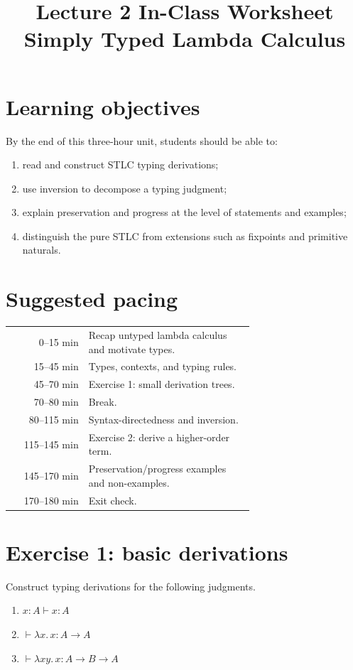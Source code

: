 \documentclass[11pt]{article}
\title{Lecture 2 In-Class Worksheet\\Simply Typed Lambda Calculus}
\author{}
\date{}
\newcommand{\lam}[1]{\lambda #1.\,}
\begin{document}
\maketitle

\section*{Learning objectives}
By the end of this three-hour unit, students should be able to:
\begin{enumerate}[nosep]
  \item read and construct STLC typing derivations;
  \item use inversion to decompose a typing judgment;
  \item explain preservation and progress at the level of statements and examples;
  \item distinguish the pure STLC from extensions such as fixpoints and primitive naturals.
\end{enumerate}

\section*{Suggested pacing}
\begin{center}
\begin{tabular}{r p{0.68\linewidth}}
0--15 min & Recap untyped lambda calculus and motivate types.\\
15--45 min & Types, contexts, and typing rules.\\
45--70 min & Exercise 1: small derivation trees.\\
70--80 min & Break.\\
80--115 min & Syntax-directedness and inversion.\\
115--145 min & Exercise 2: derive a higher-order term.\\
145--170 min & Preservation/progress examples and non-examples.\\
170--180 min & Exit check.\\
\end{tabular}
\end{center}

\section*{Exercise 1: basic derivations}
Construct typing derivations for the following judgments.
\begin{enumerate}
  \item $x : A \vdash x : A$
  \item $\vdash \lam{x}x : A \to A$
  \item $\vdash \lam{x y}x : A \to B \to A$
\end{enumerate}
\end{document}
